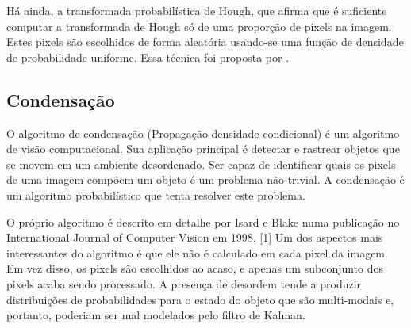 Há ainda, a transformada probabilística de Hough, que afirma que é suficiente computar a transformada de Hough só de uma proporção de pixels na imagem. Estes pixels são escolhidos de forma aleatória usando-se uma função de densidade de probabilidade uniforme. Essa técnica foi  proposta por .


\subsection{Condensação}

O algoritmo de condensação (Propagação densidade condicional) é um algoritmo de visão computacional. Sua aplicação principal é detectar e rastrear objetos que se movem em um ambiente desordenado. Ser capaz de identificar quais os pixels de uma imagem compõem um objeto é um problema não-trivial. A condensação é um algoritmo probabilístico que tenta resolver este problema.

O próprio algoritmo é descrito em detalhe por Isard e Blake numa publicação no International Journal of Computer Vision em 1998. [1] Um dos aspectos mais interessantes do algoritmo é que ele não é calculado em cada pixel da imagem. Em vez disso, os pixels são escolhidos ao acaso, e apenas um subconjunto dos pixels acaba sendo processado. A presença de desordem tende a produzir distribuições de probabilidades para o estado do objeto que são multi-modais e, portanto, poderiam ser mal modelados pelo filtro de Kalman.





